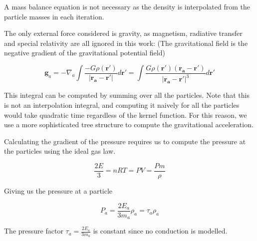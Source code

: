 \documentclass[../main.tex]{subfiles}
\begin{document}
A mass balance equation is not necessary as the density is interpolated from the particle masses in each iteration.

The only external force considered is gravity, as magnetism, radiative transfer and special relativity are all ignored in this work: (The gravitational field is the negative gradient of the gravitational potential field)

\begin{equation}
    \bm{g}_a = -\nabla_a\int\frac{-G\rho(\bm{r'})}{|\bm{r_a} - \bm{r'}|} d\bm{r'} = \int\frac{G\rho(\bm{r'})(\bm{r_a}-\bm{r'})}{|\bm{r_a}-\bm{r'}|^3} d\bm{r'}
\end{equation}

This integral can be computed by summing over all the particles. Note that this is not an interpolation integral, and computing it naively for all the particles would take quadratic time regardless of the kernel function. For this reason, we use a more sophisticated tree structure to compute the gravitational acceleration.

Calculating the gradient of the pressure requires us to compute the pressure at the particles using the ideal gas law.

\begin{equation}
    \frac{2E}{3} = nRT = PV = \frac{Pm}{\rho}
\end{equation}

Giving us the pressure at a particle

\begin{equation}
    P_a = \frac{2 E_a}{3 m_a} \rho_a = \tau_a \rho_a
\end{equation}

The pressure factor $\tau_a = \frac{2E_a}{3m_a}$ is constant since no conduction is modelled.
\end{document}
